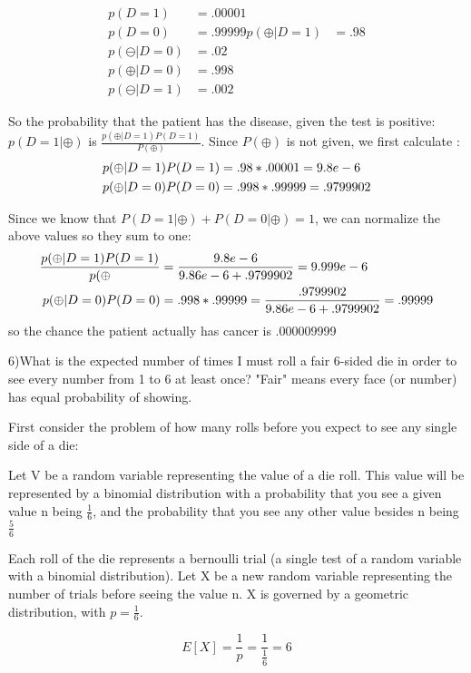 \documentclass[12pt]{article}
\begin{document}
\begin{align}
p(D=1) &= .00001 \\
p(D=0) &= .99999
p(\oplus |D=1) &= .98 \\
p(\ominus |D=0) &= .02 \\
p(\oplus |D=0) &= .998 \\
p(\ominus |D=1) &= .002
\end{align}

So the probability that the patient has the disease, given the test is positive: 
$p(D=1|\oplus)$ is $\frac{p(\oplus |D=1)P(D=1)}{P(\oplus)}$. Since $P(\oplus)$
is not given, we first calculate : 
\begin{align}
  p(\oplus |D=1)P(D=1)& = .98*.00001 = 9.8e-6 \notag \\ 
  p(\oplus |D=0)P(D=0)&=  .998*.99999 = .9799902 \notag
\end{align}

Since we know that $P(D=1|\oplus) + P(D=0|\oplus)=1$, we can normalize 
the above values so they sum to one: 
\begin{align}
  \frac{p(\oplus |D=1)P(D=1)}{p(\oplus} & = \frac{9.8e-6}{9.86e-6+.9799902} =  9.999e-6\notag \\ 
  p(\oplus |D=0)P(D=0)&=  .998*.99999 = \frac{.9799902}{9.86e-6+.9799902} = .99999 \notag
\end{align}
so the chance the patient actually has cancer is .000009999


\pagebreak
\setcounter{equation}{0}
6)What is the expected number of times I must roll a fair 6-sided die in order 
to see every number from 1 to 6 at least once? "Fair" means every face 
(or number) has equal probability of showing.

First consider the problem of how many rolls before you expect to see any single 
side of a die: 

Let V be a random variable representing the value of a die roll. This value will 
be represented by a binomial distribution with a probability that you see a given
value n being $\frac{1}{6}$, and the probability that you see any other value besides
n being $\frac{5}{6}$

Each roll of the die represents a bernoulli trial (a single test of a random variable 
with a binomial distribution). Let X be a new random variable representing the 
number of trials before seeing the value n. X is governed by a geometric distribution, 
with $p=\frac{1}{6}$. 

\begin{equation}
    E[X] =\frac{1}{p} = \frac{1}{\frac{1}{6}} = 6
\end{equation}
\end{document}
